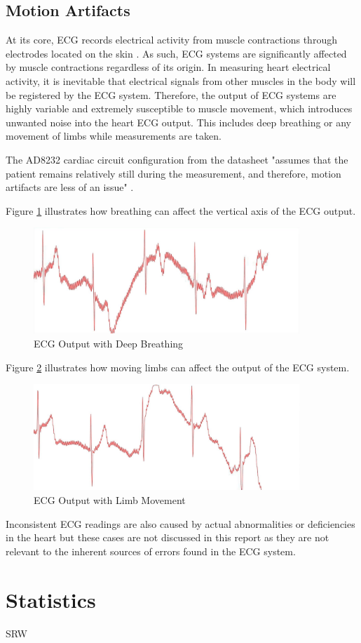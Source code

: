 \subsection{Motion Artifacts} \label{motionartifact}
At its core, ECG records electrical activity from muscle contractions through electrodes located on the skin \cite{ashley2004conquering}. As such, ECG systems are significantly affected by muscle contractions regardless of its origin. In measuring heart electrical activity, it is inevitable that electrical signals from other muscles in the body will be registered by the ECG system. Therefore, the output of ECG systems are highly variable and extremely susceptible to muscle movement, which introduces unwanted noise into the heart ECG output. This includes deep breathing or any movement of limbs while measurements are taken. 

The AD8232 cardiac circuit configuration from the datasheet "assumes that the patient remains relatively still during the measurement, and therefore, motion artifacts are less of an issue" \cite{ad8232datasheet}.

Figure \ref{ecgbreathing} illustrates how breathing can affect the vertical axis of the ECG output. 

\begin{figure}[H]
	\centering
	\includegraphics[width=\linewidth,height=40mm,frame]{ecgtest12.jpg}
	\caption{ECG Output with Deep Breathing}
	\label{ecgbreathing}
\end{figure} 

Figure \ref{ecgmovement} illustrates how moving limbs can affect the output of the ECG system. 

\begin{figure}[H]
	\centering
	\includegraphics[width=\linewidth,height=40mm,frame]{ecgtest7.jpg}
	\caption{ECG Output with Limb Movement}
	\label{ecgmovement}
\end{figure} 

Inconsistent ECG readings are also caused by actual abnormalities or deficiencies in the heart but these cases are not discussed in this report as they are not relevant to the inherent sources of errors found in the ECG system. 


\section{Statistics}

SRW